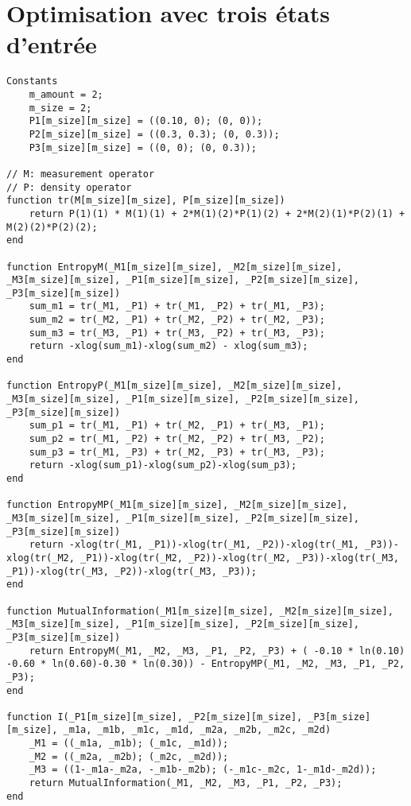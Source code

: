 \section{Optimisation avec trois états d'entrée}
\label{appendix:ibex_3}

\begin{lstlisting}[style=CStyle]
Constants
    m_amount = 2;
    m_size = 2;
    P1[m_size][m_size] = ((0.10, 0); (0, 0));
    P2[m_size][m_size] = ((0.3, 0.3); (0, 0.3));
    P3[m_size][m_size] = ((0, 0); (0, 0.3));
  
// M: measurement operator
// P: density operator
function tr(M[m_size][m_size], P[m_size][m_size])
    return P(1)(1) * M(1)(1) + 2*M(1)(2)*P(1)(2) + 2*M(2)(1)*P(2)(1) + M(2)(2)*P(2)(2);
end

function EntropyM(_M1[m_size][m_size], _M2[m_size][m_size], _M3[m_size][m_size], _P1[m_size][m_size], _P2[m_size][m_size], _P3[m_size][m_size])
    sum_m1 = tr(_M1, _P1) + tr(_M1, _P2) + tr(_M1, _P3);
    sum_m2 = tr(_M2, _P1) + tr(_M2, _P2) + tr(_M2, _P3);
    sum_m3 = tr(_M3, _P1) + tr(_M3, _P2) + tr(_M3, _P3);
    return -xlog(sum_m1)-xlog(sum_m2) - xlog(sum_m3);
end

function EntropyP(_M1[m_size][m_size], _M2[m_size][m_size], _M3[m_size][m_size], _P1[m_size][m_size], _P2[m_size][m_size], _P3[m_size][m_size])
    sum_p1 = tr(_M1, _P1) + tr(_M2, _P1) + tr(_M3, _P1);
    sum_p2 = tr(_M1, _P2) + tr(_M2, _P2) + tr(_M3, _P2);
    sum_p3 = tr(_M1, _P3) + tr(_M2, _P3) + tr(_M3, _P3);
    return -xlog(sum_p1)-xlog(sum_p2)-xlog(sum_p3);
end

function EntropyMP(_M1[m_size][m_size], _M2[m_size][m_size], _M3[m_size][m_size], _P1[m_size][m_size], _P2[m_size][m_size], _P3[m_size][m_size])
    return -xlog(tr(_M1, _P1))-xlog(tr(_M1, _P2))-xlog(tr(_M1, _P3))-xlog(tr(_M2, _P1))-xlog(tr(_M2, _P2))-xlog(tr(_M2, _P3))-xlog(tr(_M3, _P1))-xlog(tr(_M3, _P2))-xlog(tr(_M3, _P3));
end

function MutualInformation(_M1[m_size][m_size], _M2[m_size][m_size], _M3[m_size][m_size], _P1[m_size][m_size], _P2[m_size][m_size], _P3[m_size][m_size])
    return EntropyM(_M1, _M2, _M3, _P1, _P2, _P3) + ( -0.10 * ln(0.10) -0.60 * ln(0.60)-0.30 * ln(0.30)) - EntropyMP(_M1, _M2, _M3, _P1, _P2, _P3);
end

function I(_P1[m_size][m_size], _P2[m_size][m_size], _P3[m_size][m_size], _m1a, _m1b, _m1c, _m1d, _m2a, _m2b, _m2c, _m2d)
    _M1 = ((_m1a, _m1b); (_m1c, _m1d));
    _M2 = ((_m2a, _m2b); (_m2c, _m2d));
    _M3 = ((1-_m1a-_m2a, -_m1b-_m2b); (-_m1c-_m2c, 1-_m1d-_m2d));
    return MutualInformation(_M1, _M2, _M3, _P1, _P2, _P3);
end


\end{lstlisting}
